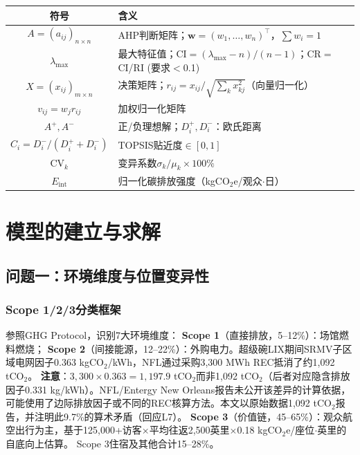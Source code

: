 \documentclass[12pt]{ctexart}
\begin{document}
\begin{center}
\begin{tabular}{cl}
\toprule
\textbf{符号} & \textbf{含义} \\
\midrule
$A=(a_{ij})_{n\times n}$ & AHP判断矩阵；$\bm{w}=(w_1,\ldots,w_n)^\top$，$\sum w_i=1$ \\
$\lambda_{\max}$ & 最大特征值；CI$=(\lambda_{\max}-n)/(n-1)$；CR$=$CI/RI (要求$<$0.1) \\
$X=(x_{ij})_{m\times n}$ & 决策矩阵；$r_{ij}=x_{ij}/\sqrt{\sum_k x_{kj}^2}$（向量归一化） \\
$v_{ij}=w_j r_{ij}$ & 加权归一化矩阵 \\
$A^+,A^-$ & 正/负理想解；$D_i^+,D_i^-$：欧氏距离 \\
$C_i=D_i^-/(D_i^++D_i^-)$ & TOPSIS贴近度$\in[0,1]$ \\
$\text{CV}_k$ & 变异系数$\sigma_k/\mu_k\times100\%$ \\
$E_{\text{int}}$ & 归一化碳排放强度（kgCO$_2$e/观众$\cdot$日） \\
\bottomrule
\end{tabular}
\end{center}

\section{模型的建立与求解}\label{sec:model}

\subsection{问题一：环境维度与位置变异性}\label{sec:q1}

\subsubsection{Scope 1/2/3分类框架}

参照GHG Protocol\cite{GHGProtocol}，识别7大环境维度：
\textbf{Scope 1}（直接排放，5--12\%）：场馆燃料燃烧；
\textbf{Scope 2}（间接能源，12--22\%）：外购电力。超级碗LIX期间SRMV子区域电网因子0.363 kgCO$_2$/kWh\cite{EPAeGRID}，NFL通过采购3,300 MWh REC抵消了约1,092 tCO$_2$。
\textbf{注意}：$3{,}300\times 0.363=1{,}197.9$ tCO$_2$而非1,092 tCO$_2$（后者对应隐含排放因子0.331 kg/kWh）。NFL/Entergy New Orleans报告未公开该差异的计算依据，可能使用了边际排放因子或不同的REC核算方法。本文以原始数据1,092 tCO$_2$报告，并注明此9.7\%的算术矛盾（回应L7）。
\textbf{Scope 3}（价值链，45--65\%）：观众航空出行为主，基于125,000+访客$\times$平均往返2,500英里$\times$0.18 kgCO$_2$e/座位$\cdot$英里的自底向上估算\cite{Jones2018,Collins2009}。
Scope 3住宿及其他合计15--28\%。
\end{document}
